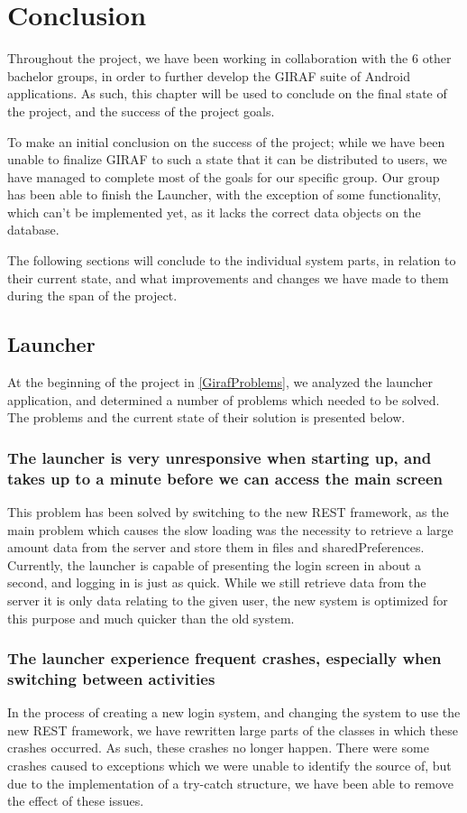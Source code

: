 \chapter{Conclusion}
Throughout the project, we have been working in collaboration with the 6 other
bachelor groups, in order to further develop the GIRAF suite of Android
applications. As such, this chapter will be used to conclude on the final state
of the project, and the success of the project goals.\nl

To make an initial conclusion on the success of the project; while we have been
unable to finalize GIRAF to such a state that it can be distributed to users, we
have managed to complete most of the goals for our specific group. Our group has
been able to finish the Launcher, with the exception of some functionality,
which can't be implemented yet, as it lacks the correct data objects on the
database.\nl

The following sections will conclude to the individual system parts, in relation
to their current state, and what improvements and changes we have made to them
during the span of the project.

\section{Launcher}
At the beginning of the project in \autoref{GirafProblems}, we analyzed the
launcher application, and determined a number of problems which needed to be
solved. The problems and the current state of their solution is presented
below.

\subsection*{The launcher is very unresponsive when starting up, and takes up to
a minute before we can access the main screen}
 This problem has been solved by
switching to the new REST framework, as the main problem which causes the slow
loading was the necessity to retrieve a large amount data from the server
and store them in files and sharedPreferences. Currently, the launcher
is capable of presenting the login screen in about a second, and logging in is just as quick.
While we still retrieve data from the server it is only data relating to the
given user, the new system is optimized for this purpose and much quicker than the old system.

\subsection*{The launcher experience frequent crashes, especially when switching between
activities}
In the process of creating a new login system, and changing the
 system to use the new REST framework, we have rewritten large parts of the
classes in which these crashes occurred. As such, these crashes no longer
happen. There were some crashes caused to exceptions which we were unable to
identify the source of, but due to the implementation of a try-catch structure,
we have been able to remove the effect of these issues.

